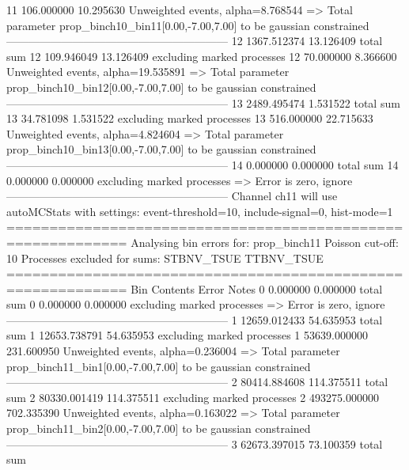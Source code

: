 11         106.000000      10.295630       Unweighted events, alpha=8.768544
  => Total parameter prop_binch10_bin11[0.00,-7.00,7.00] to be gaussian constrained
------------------------------------------------------------
12         1367.512374     13.126409       total sum                     
12         109.946049      13.126409       excluding marked processes    
12         70.000000       8.366600        Unweighted events, alpha=19.535891
  => Total parameter prop_binch10_bin12[0.00,-7.00,7.00] to be gaussian constrained
------------------------------------------------------------
13         2489.495474     1.531522        total sum                     
13         34.781098       1.531522        excluding marked processes    
13         516.000000      22.715633       Unweighted events, alpha=4.824604
  => Total parameter prop_binch10_bin13[0.00,-7.00,7.00] to be gaussian constrained
------------------------------------------------------------
14         0.000000        0.000000        total sum                     
14         0.000000        0.000000        excluding marked processes    
  => Error is zero, ignore      
------------------------------------------------------------
Channel ch11 will use autoMCStats with settings: event-threshold=10, include-signal=0, hist-mode=1
============================================================
Analysing bin errors for: prop_binch11
Poisson cut-off: 10
Processes excluded for sums: STBNV_TSUE TTBNV_TSUE
============================================================
Bin        Contents        Error           Notes                         
0          0.000000        0.000000        total sum                     
0          0.000000        0.000000        excluding marked processes    
  => Error is zero, ignore      
------------------------------------------------------------
1          12659.012433    54.635953       total sum                     
1          12653.738791    54.635953       excluding marked processes    
1          53639.000000    231.600950      Unweighted events, alpha=0.236004
  => Total parameter prop_binch11_bin1[0.00,-7.00,7.00] to be gaussian constrained
------------------------------------------------------------
2          80414.884608    114.375511      total sum                     
2          80330.001419    114.375511      excluding marked processes    
2          493275.000000   702.335390      Unweighted events, alpha=0.163022
  => Total parameter prop_binch11_bin2[0.00,-7.00,7.00] to be gaussian constrained
------------------------------------------------------------
3          62673.397015    73.100359       total sum                     
